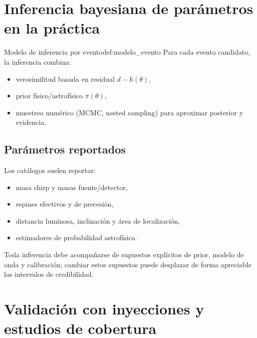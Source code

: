 \section{Inferencia bayesiana de parámetros en la práctica}
\label{sec:inferencia_practica}

\begin{definicion}{Modelo de inferencia por evento}{def:modelo_evento}
Para cada evento candidato, la inferencia combina:
\begin{itemize}[leftmargin=2em]
  \item verosimilitud basada en residual $d-h(\theta)$,
  \item prior físico/astrofísico $\pi(\theta)$,
  \item muestreo numérico (MCMC, nested sampling) para aproximar posterior y evidencia.
\end{itemize}
\end{definicion}

\subsection{Parámetros reportados}

Los catálogos suelen reportar:
\begin{itemize}[leftmargin=2em]
  \item masa chirp y masas fuente/detector,
  \item espines efectivos y de precesión,
  \item distancia luminosa, inclinación y área de localización,
  \item estimadores de probabilidad astrofísica.
\end{itemize}

\begin{importante}
Toda inferencia debe acompañarse de supuestos explícitos de prior, modelo de onda y calibración; cambiar estos supuestos puede desplazar de forma apreciable los intervalos de credibilidad.
\end{importante}

\section{Validación con inyecciones y estudios de cobertura}
\label{sec:inyecciones_cobertura}

